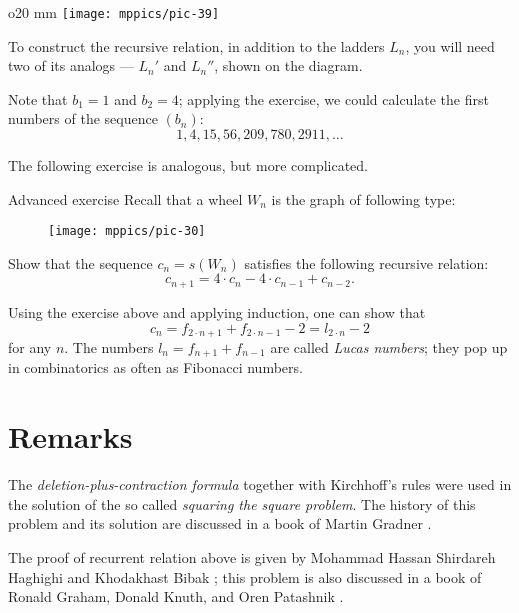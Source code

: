 \begin{wrapfigure}{o}{20 mm}
\vskip-4mm
\centering
\texttt{[image: mppics/pic-39]}
\end{wrapfigure}

 To construct the recursive relation, in addition to the ladders $L_n$, you will need two of its analogs --- $L_n'$ and $L_n''$, shown on the diagram.

\medskip

Note that $b_1=1$ and $b_2=4$; applying the exercise, we could calculate the first numbers of the sequence $(b_n)$:
\[1,4,15,56,209,780,2911,\dots \]

The following exercise is analogous, but more complicated.

\begin{thm}{Advanced exercise}
Recall that a wheel $W_n$ is the graph of following type:

\begin{figure}[h!]
\centering
\texttt{[image: mppics/pic-30]}
\end{figure}

Show that the sequence $c_n=s(W_n)$ satisfies the following recursive relation:
\[c_{n+1}=4\cdot c_n-4\cdot c_{n-1}+c_{n-2}.\]

\end{thm}

Using the exercise above and applying induction, one can show that 
\[c_n=f_{2\cdot n+1}+f_{2\cdot n-1}-2=l_{2\cdot  n}-2\]
for any $n$.
The numbers $l_n=f_{n+1}+f_{n-1}$ are called \emph{Lucas numbers};
they pop up in combinatorics as often as Fibonacci numbers.  

\section*{Remarks}

The \emph{deletion-plus-contraction formula} together with Kirchhoff's rules were used in the solution of the so called \emph{squaring the square problem}.
The history of this problem and its solution are discussed in a book of Martin Gradner \cite[Chapter 17]{gardiner}.

The proof of recurrent relation above is given by Mohammad Hassan Shirdareh Haghighi and Khodakhast Bibak \cite[see][]{haghighi-bibak};
this problem is also discussed in a book of  Ronald Graham, Donald Knuth, and Oren Patashnik \cite[see][]{knut}.
